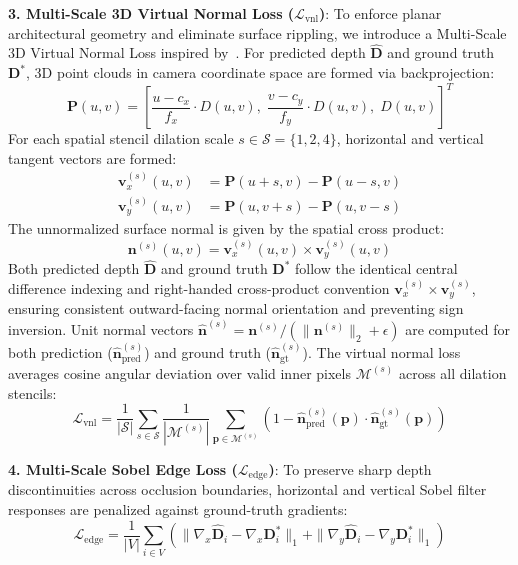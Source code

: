\noindent\textbf{3. Multi-Scale 3D Virtual Normal Loss ($\mathcal{L}_{\text{vnl}}$)}:
To enforce planar architectural geometry and eliminate surface rippling, we introduce a Multi-Scale 3D Virtual Normal Loss inspired by~\cite{yin2019enforcing}. For predicted depth $\hat{\mathbf{D}}$ and ground truth $\mathbf{D}^*$, 3D point clouds in camera coordinate space are formed via backprojection:
\begin{equation}
    \mathbf{P}(u, v) = \left[ \frac{u - c_x}{f_x} \cdot D(u, v), \; \frac{v - c_y}{f_y} \cdot D(u, v), \; D(u, v) \right]^T
\end{equation}
For each spatial stencil dilation scale $s \in \mathcal{S} = \{1, 2, 4\}$, horizontal and vertical tangent vectors are formed:
\begin{equation}
\begin{aligned}
    \mathbf{v}_x^{(s)}(u, v) &= \mathbf{P}(u + s, v) - \mathbf{P}(u - s, v) \\
    \mathbf{v}_y^{(s)}(u, v) &= \mathbf{P}(u, v + s) - \mathbf{P}(u, v - s)
\end{aligned}
\end{equation}
The unnormalized surface normal is given by the spatial cross product:
\begin{equation}
    \mathbf{n}^{(s)}(u, v) = \mathbf{v}_x^{(s)}(u, v) \times \mathbf{v}_y^{(s)}(u, v)
\end{equation}
Both predicted depth $\hat{\mathbf{D}}$ and ground truth $\mathbf{D}^*$ follow the identical central difference indexing and right-handed cross-product convention $\mathbf{v}_x^{(s)} \times \mathbf{v}_y^{(s)}$, ensuring consistent outward-facing normal orientation and preventing sign inversion. Unit normal vectors $\hat{\mathbf{n}}^{(s)} = \mathbf{n}^{(s)} / (\|\mathbf{n}^{(s)}\|_2 + \epsilon)$ are computed for both prediction ($\hat{\mathbf{n}}_{\text{pred}}^{(s)}$) and ground truth ($\hat{\mathbf{n}}_{\text{gt}}^{(s)}$). The virtual normal loss averages cosine angular deviation over valid inner pixels $\mathcal{M}^{(s)}$ across all dilation stencils:
\begin{equation}
    \mathcal{L}_{\text{vnl}} = \frac{1}{|\mathcal{S}|} \sum_{s \in \mathcal{S}} \frac{1}{|\mathcal{M}^{(s)}|} \sum_{\mathbf{p} \in \mathcal{M}^{(s)}} \left( 1 - \hat{\mathbf{n}}_{\text{pred}}^{(s)}(\mathbf{p}) \cdot \hat{\mathbf{n}}_{\text{gt}}^{(s)}(\mathbf{p}) \right)
\end{equation}

\noindent\textbf{4. Multi-Scale Sobel Edge Loss ($\mathcal{L}_{\text{edge}}$)}:
To preserve sharp depth discontinuities across occlusion boundaries, horizontal and vertical Sobel filter responses are penalized against ground-truth gradients:
\begin{equation}
    \mathcal{L}_{\text{edge}} = \frac{1}{|V|} \sum_{i \in V} \left( \|\nabla_x \hat{\mathbf{D}}_i - \nabla_x \mathbf{D}_i^*\|_1 + \|\nabla_y \hat{\mathbf{D}}_i - \nabla_y \mathbf{D}_i^*\|_1 \right)
\end{equation}

